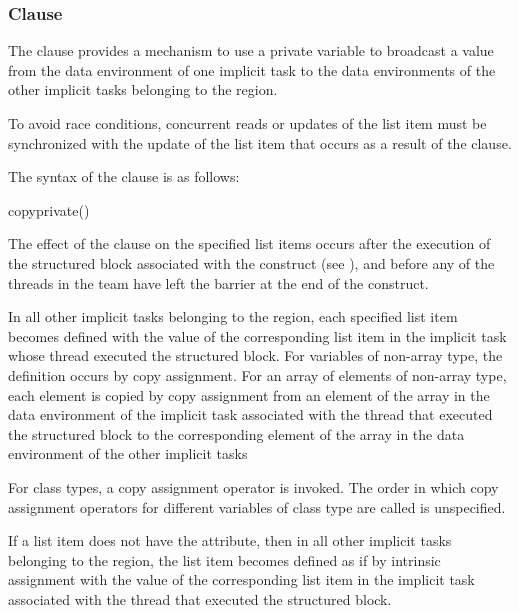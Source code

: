 \subsubsection{ Clause}
\label{subsubsec:copyprivate clause}
\summary
The  clause provides a mechanism to use a private variable to broadcast 
a value from the data environment of one implicit task to the data environments of the 
other implicit tasks belonging to the  region.

To avoid race conditions, concurrent reads or updates of the list item must be 
synchronized with the update of the list item that occurs as a result of the 
 clause.

\syntax
The syntax of the  clause is as follows:

\begin{boxedcode}
copyprivate()
\end{boxedcode}

\descr
The effect of the  clause on the specified list items occurs after the 
execution of the structured block associated with the  construct (see 
), 
and before any of the threads in the team have left the barrier 
at the end of the construct.

\ccppspecificstart
In all other implicit tasks belonging to the  region, each specified list item 
becomes defined with the value of the corresponding list item in the implicit task whose 
thread executed the structured block. For variables of non-array type, the definition 
occurs by copy assignment. For an array of elements of non-array type, each element is
copied by copy assignment from an element of the array in the data environment of the 
implicit task associated with the thread that executed the structured block to the 
corresponding element of the array in the data environment of the other implicit tasks
\ccppspecificend

\cppspecificstart
For class types, a copy assignment operator is invoked. The order in which copy 
assignment operators for different variables of class type are called is unspecified. 
\cppspecificend

\fortranspecificstart
If a list item does not have the  attribute, then in all other implicit tasks 
belonging to the  region, the list item becomes defined as if by intrinsic 
assignment with the value of the corresponding list item in the implicit task associated 
with the thread that executed the structured block. 

